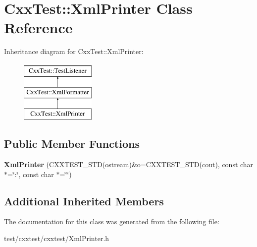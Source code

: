 \hypertarget{classCxxTest_1_1XmlPrinter}{\section{Cxx\-Test\-:\-:Xml\-Printer Class Reference}
\label{classCxxTest_1_1XmlPrinter}
}
Inheritance diagram for Cxx\-Test\-:\-:Xml\-Printer\-:\begin{figure}[H]
\begin{center}
\leavevmode
\includegraphics[height=3.000000cm]{classCxxTest_1_1XmlPrinter}
\end{center}
\end{figure}
\subsection*{Public Member Functions}
\begin{DoxyCompactItemize}
\item 
\hypertarget{classCxxTest_1_1XmlPrinter_a0aa533a6c823e7e493aa70f0c8c38064}{{\bfseries Xml\-Printer} (C\-X\-X\-T\-E\-S\-T\-\_\-\-S\-T\-D(ostream)\&o=C\-X\-X\-T\-E\-S\-T\-\_\-\-S\-T\-D(cout), const char $\ast$=\char`\"{}\-:\char`\"{}, const char $\ast$=\char`\"{}\char`\"{})}\label{classCxxTest_1_1XmlPrinter_a0aa533a6c823e7e493aa70f0c8c38064}

\end{DoxyCompactItemize}
\subsection*{Additional Inherited Members}


The documentation for this class was generated from the following file\-:\begin{DoxyCompactItemize}
\item 
test/cxxtest/cxxtest/Xml\-Printer.\-h\end{DoxyCompactItemize}

